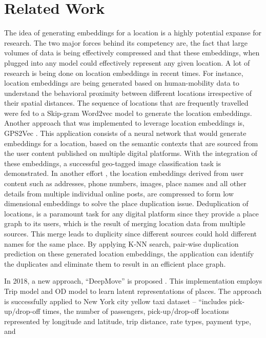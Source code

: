 \documentclass{article}
\begin{document}
\section{Related Work}
The idea of generating embeddings for a location is a highly potential expanse for
research. The two major forces behind its competency are, the fact that large volumes of
data is being effectively compressed and that these embeddings, when plugged into any
model could effectively represent any given location.  A lot of research is being done 
on location embeddings in recent times. For instance, location embeddings are being 
generated based on human-mobility data \parencite{GeoEmbeddings} to understand the 
behavioral proximity between different locations irrespective of their spatial distances.
The sequence of locations that are frequently travelled were fed to a Skip-gram Word2vec 
model to generate the location embeddings. Another approach that was implemented to 
leverage location embeddings is, GPS2Vec  \parencite{GPS2Vec}.  This application consists
of a neural network that would generate embeddings for a location, based on the semantic 
contexts that are sourced from the user content published on multiple digital platforms.
With the integration of these embeddings, a successful geo-tagged image classification 
task is demonstrated. In another effort  \parencite{PlaceDeduplication}, the location 
embeddings derived from user content such as addresses, phone numbers, images, place
names and all other details from multiple individual online posts, are compressed to 
form low dimensional embeddings to solve the place duplication issue. Deduplication of 
locations, is a paramount task for any digital platform since they provide a place graph
to its users, which is the result of merging location data from multiple sources. This 
merge leads to duplicity since different sources could hold different names for the same 
place. By applying K-NN search, pair-wise duplication prediction on these generated 
location embeddings, the application can identify the duplicates and eliminate them to 
result in an efficient place graph.\par
In 2018, a new approach, “DeepMove” is proposed \parencite{DeepMove}. This 
implementation employs Trip model and OD model to learn latent representations of 
places.  The approach is successfully applied to New York city yellow taxi dataset – 
“includes pick-up/drop-off times, the number of passengers, pick-up/drop-off locations 
represented by longitude and latitude, trip distance, rate types, payment type, and
\end{document}
